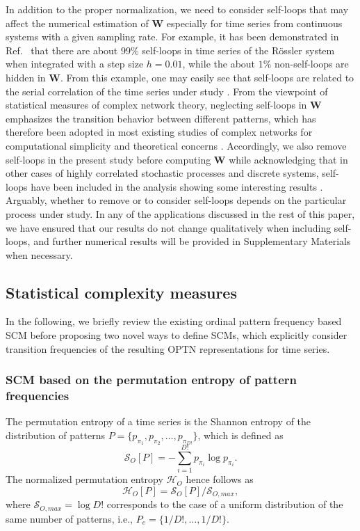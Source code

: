 \documentclass[aip,cha,reprint,nofootinbib]{revtex4-1}
\begin{document}
In addition to the proper normalization, we need to consider self-loops that may affect the numerical estimation of $\mathbf{W}$ especially for time series from continuous systems with a given sampling rate. For example, it has been demonstrated in Ref.~\cite{zhangSciRep2017} that there are about $99\%$ self-loops in time series of the R\"ossler system when integrated with a step size $h = 0.01$, while the about $1\%$ non-self-loops are hidden in $\mathbf{W}$. From this example, one may easily see that self-loops are related to the serial correlation of the time series under study \cite{BorgesAMC2019}. {\color{red} From the viewpoint of statistical measures of complex network theory}, neglecting self-loops in $\mathbf{W}$ emphasizes the transition behavior between different patterns, which has therefore been adopted in most existing studies of complex networks for computational simplicity and theoretical concerns \cite{CostaADPhy2007}. Accordingly, we also remove self-loops in the present study before computing $\mathbf{W}$ while acknowledging that in other cases of {\color{red} highly correlated} stochastic processes and discrete systems, self-loops have been included in the analysis showing some interesting results \cite{BorgesAMC2019}. Arguably, whether to remove or to consider self-loops depends on the particular process under study. In any of the applications discussed in the rest of this paper, we have ensured that our results do not change qualitatively when including self-loops{\color{red}, and further numerical results will be provided in Supplementary Materials when necessary. }

\subsection{Statistical complexity measures} \label{sec:SCM}

In the following, we briefly review the existing ordinal pattern frequency based SCM before proposing two novel ways to define SCMs, which explicitly consider transition frequencies of the resulting OPTN representations for time series. 
 
\subsubsection{SCM based on the permutation entropy of pattern frequencies} 

The permutation entropy of a time series is the Shannon entropy of the distribution of patterns $P = \{p_{\pi_1}, p_{\pi_2},\ldots,p_{\pi_{D!}} \}$, which is defined as
\begin{equation}
\mathcal{S}_{O}[P]= - \sum_{i=1}^{D!} p_{\pi_i} \log p_{\pi_i}. 
\end{equation}
The normalized permutation entropy $\mathcal{H}_O$ hence follows as 
\begin{equation} \label{eq:Ho}
\mathcal{H}_{O}[P] = \mathcal{S}_{O}[P] / \mathcal{S}_{O, max}, 
\end{equation}
where $\mathcal{S}_{O, max} = \log D!$ corresponds to the case of a uniform distribution of the same number of patterns, i.e., $P_e = \{1/D!, \ldots, 1/D!\}$. 
\end{document}
